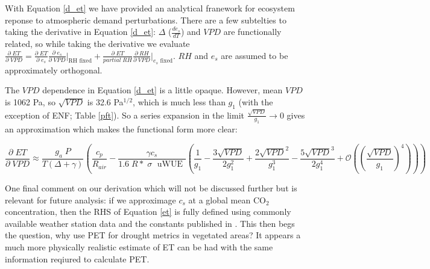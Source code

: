\documentclass[draft,linenumbers]{agujournal}
\begin{document}
With Equation \ref{d_et} we have provided an analytical franework for ecosystem reponse to atmospheric demand perturbations. There are a few subtelties to taking the derivative in Equation \ref{d_et}: $\Delta$ ($\frac{d e_{s}}{d T}$) and $VPD$ are functionally related, so while taking the derivative we evaluate $\frac{\partial \; ET}{\partial \; VPD} = \frac{\partial \; ET} {\partial \; e_s} \frac{\partial \; e_s}{\partial \; VPD} \Big|_{\text{RH fixed}} + \frac{\partial \; ET}{partial \; RH} \frac{\partial \; RH}{\partial \; VPD} \Big|_{\text{$e_s$ fixed}}$. $RH$ and $e_s$ are assumed to be approximately orthogonal.



The $VPD$ dependence in Equation \ref{d_et} is a little opaque. However, mean $VPD$ is 1062 Pa, so $\sqrt{VPD}$ is 32.6 Pa$^{1/2}$, which is much less than $g_1$ (with the exception of ENF; Table \ref{pft}). So a series expansion in the limit $\frac{\sqrt{VPD}}{g_1} \to 0$ gives an approximation which makes the functional form more clear: 

\begin{linenomath*}
  \begin{equation}
    \frac{\partial \;  ET}{\partial \; VPD} \approx \frac{g_a \; P}{T(\Delta + \gamma)}   \left(\frac{ c_p}{R_{air}} -  \frac{\gamma c_s }{1.6 \; R*\; \sigma \; \text{ uWUE }} \left( \frac{1}{g_{1}} - \frac{3 \sqrt{VPD}}{2 g_{1}^{2}} + \frac{2 \sqrt{VPD}^{2}}{g_{1}^{3}} - \frac{5 \sqrt{VPD}^{3}}{2 g_{1}^{4}} + \mathcal{O}\left(\left(\frac{\sqrt{VPD}}{g_1}\right)^{4}\right) \right) \right)
    \label{d_et_approx}
  \end{equation}
\end{linenomath*}

One final comment on our derivation which will not be discussed further but is relevant for future analysis: if we  approximage $c_s$ at a global mean CO$_2$ concentration, then the RHS of Equation \ref{et} is fully defined using commonly available weather station data and the constants published in \citet{Zhou_2015, Lin_2015}. This then begs the question, why use PET for drought metrics in vegetated areas? It appears a much more physically realistic estimate of ET can be had with the same information reqiured to calculate PET. 
\end{document}
